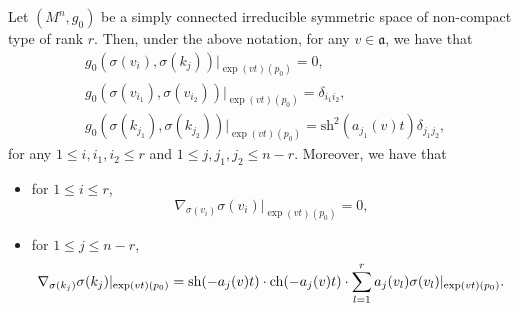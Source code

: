 \documentclass[10pt,a4paper]{amsart}
\begin{document}
\begin{lemma}\label{spherical frame}
    Let $(M^n, g_0)$ be a simply connected irreducible symmetric space of non-compact type of rank $r$. Then, under the above notation, for any $v\in \mathfrak{a}$, we have that 
    \begin{equation}\label{orthonormal basis on radius}
        \begin{split}
            &g_0(\sigma(v_i), \sigma(k_j))|_{\exp(v t)(p_0)} = 0,\\
            &g_0(\sigma(v_{i_1}),\sigma(v_{i_2}))|_{\exp(vt)(p_0)} = \delta_{i_1i_2},\\
            &g_0(\sigma(k_{j_1}), \sigma(k_{j_2}))|_{\exp(vt)(p_0)} = \mathrm{sh}^2(a_{j_1}(v)t)\delta_{j_1j_2},
        \end{split}
    \end{equation}
    for any $1\leq i, i_1, i_2 \leq r$ and $1 \leq j, j_1, j_2 \leq n - r$. Moreover, we have that 
    \begin{itemize}
        \item for $1 \leq i \leq r$,
        \begin{equation}\label{covariant derivative on radius 1}
            \nabla_{\sigma(v_i)}\sigma(v_i)|_{\exp(vt)(p_0)} = 0,
        \end{equation}
        \item for $1 \leq j \leq n - r$,
        \begin{equation}\label{covariant derivative on radius 2}
            \nabla_{\sigma(k_j)}\sigma(k_j)|_{\exp(vt)(p_0)}\\ 
            = \mathrm{sh}(-a_j(v)t)\cdot \mathrm{ch}(-a_j(v)t)\cdot \sum_{l = 1}^{r}a_j(v_l)\sigma(v_l)|_{\exp(vt)(p_0)}. 
        \end{equation}
    \end{itemize}
\end{lemma}
\end{document}
